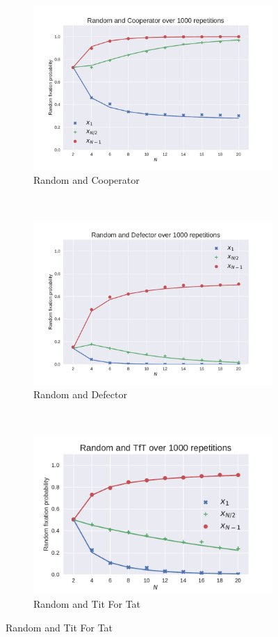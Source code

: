 \documentclass{article}
\begin{document}
\begin{figure}[!hbtp]
    \centering
    \begin{subfigure}[t]{.3\textwidth}
        \centering
        \includegraphics[width=.8\textwidth]{./img/Random_v_Cooperator.pdf}
        \caption{Random and Cooperator}
    \end{subfigure}%
    ~
    \begin{subfigure}[t]{.3\textwidth}
        \centering
        \includegraphics[width=.8\textwidth]{./img/Random_v_Defector.pdf}
        \caption{Random and Defector}
    \end{subfigure}%
    ~
    \begin{subfigure}[t]{.3\textwidth}
        \centering
        \includegraphics[width=.8\textwidth]{./img/Random_v_TfT.pdf}
        \caption{Random and Tit For Tat}
    \end{subfigure}%


\end{figure}
\end{document}
